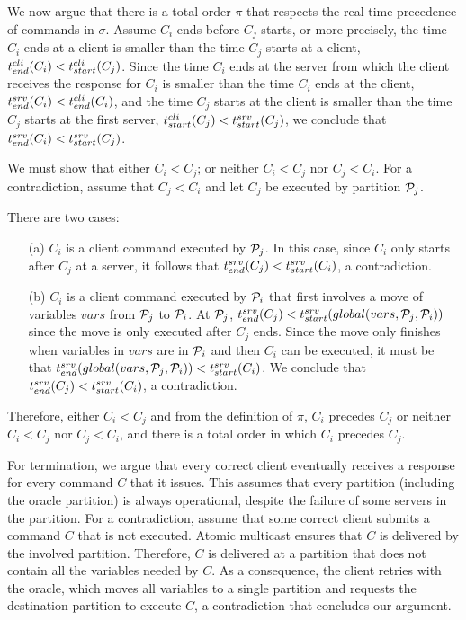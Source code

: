 %
We now argue that there is a total order $\pi$ that respects the real-time precedence of commands in $\sigma$.
Assume $C_i$ ends before $C_j$ starts, or more precisely, the time $C_i$ ends at a client is smaller than the time $C_j$ starts at a client, $t^{cli}_{end}(C_i) < t^{cli}_{start}(C_j)$.
Since the time $C_i$ ends at the server from which the client receives the response for $C_i$ is smaller than the time $C_i$ ends at the client, $t^{srv}_{end}(C_i) < t^{cli}_{end}(C_i)$, and the time $C_j$ starts at the client is smaller than the time $C_j$ starts at the first server, $t^{cli}_{start}(C_j) < t^{srv}_{start}(C_j)$, we conclude that $t^{srv}_{end}(C_i) < t^{srv}_{start}(C_j)$.

We must show that either $C_i < C_j$; or neither $C_i < C_j$ nor $C_j < C_i$.
For a contradiction, assume that $C_j <  C_i$ and let $C_j$ be executed by partition $\mathcal{P}_j$.

There are two cases: 
\begin{enumerate}
\item[(a)] $C_i$ is a client command executed by $\mathcal{P}_j$.
In this case, since $C_i$ only starts after $C_j$ at a server, it follows that $t^{srv}_{end}(C_j) < t^{srv}_{start}(C_i)$, a contradiction.
\item[(b)] $C_i$ is a client command executed by $\mathcal{P}_i$ that first involves a move of variables $vars$ from $\mathcal{P}_j$ to $\mathcal{P}_i$.
At $\mathcal{P}_j$, $t^{srv}_{end}(C_j) < t^{srv}_{start}(global(vars,\mathcal{P}_j,\mathcal{P}_i))$ since the move is only executed after $C_j$ ends.
Since the move only finishes when variables in $vars$ are in $\mathcal{P}_i$ and then $C_i$ can be executed, it must be that
$t^{srv}_{end}(global(vars,\mathcal{P}_j,\mathcal{P}_i)) < t^{srv}_{start}(C_i)$.
We conclude that $t^{srv}_{end}(C_j) < t^{srv}_{start}(C_i)$, a contradiction.
\end{enumerate}
Therefore, either $C_i < C_j$ and from the definition of $\pi$, $C_i$ precedes $C_j$ or neither $C_i < C_j$ nor $C_j < C_i$, and there is a total order in which $C_i$ precedes $C_j$.

For termination, we argue that every correct client eventually receives a response for every command $C$ that it issues.
This assumes that every partition (including the oracle partition) is always operational, despite the failure of some servers in the partition.
For a contradiction, assume that some correct client submits a command $C$ that is not executed.
Atomic multicast ensures that $C$ is delivered by the involved partition.
Therefore, $C$ is delivered at a partition that does not contain all the variables needed by $C$.
As a consequence, the client retries with the oracle, which moves all variables to a single partition and requests the destination partition to execute $C$, a contradiction that concludes our argument.


